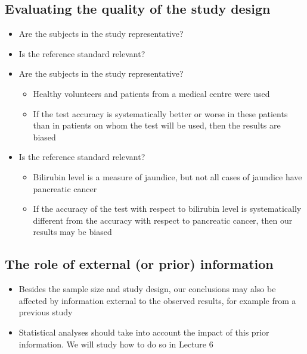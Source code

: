 \documentclass[
]{book}
\providecommand{\tightlist}{%
  \setlength{\itemsep}{0pt}\setlength{\parskip}{0pt}}
\begin{document}
\hypertarget{evaluating-the-quality-of-the-study-design}{%
\subsection{Evaluating the quality of the study design}\label{evaluating-the-quality-of-the-study-design}}

\begin{itemize}
\tightlist
\item
  Are the subjects in the study representative?
\item
  Is the reference standard relevant?
\item
  Are the subjects in the study representative?

  \begin{itemize}
  \tightlist
  \item
    Healthy volunteers and patients from a medical centre were used
  \item
    If the test accuracy is systematically better or worse in these patients than in patients on whom the test will be used, then the results are biased\\
  \end{itemize}
\item
  Is the reference standard relevant?

  \begin{itemize}
  \tightlist
  \item
    Bilirubin level is a measure of jaundice, but not all cases of jaundice have pancreatic cancer
  \item
    If the accuracy of the test with respect to bilirubin level is systematically different from the accuracy with respect to pancreatic cancer, then our results may be biased
  \end{itemize}
\end{itemize}

\hypertarget{the-role-of-external-or-prior-information}{%
\subsection{The role of external (or prior) information}\label{the-role-of-external-or-prior-information}}

\begin{itemize}
\tightlist
\item
  Besides the sample size and study design, our conclusions may also be affected by information external to the observed results, for example from a previous study
\item
  Statistical analyses should take into account the impact of this prior information. We will study how to do so in Lecture 6
\end{itemize}
\end{document}
